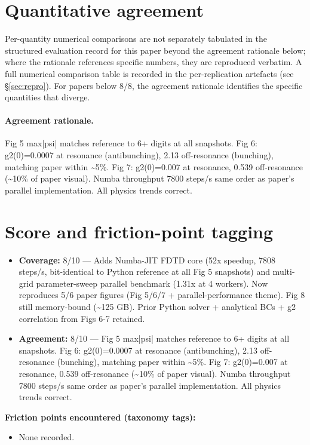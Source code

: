 \documentclass[11pt]{article}
\begin{document}
\section{Quantitative agreement}
Per-quantity numerical comparisons are not separately tabulated in the structured evaluation record for this paper beyond the agreement rationale below; where the rationale references specific numbers, they are reproduced verbatim. A full numerical comparison table is recorded in the per-replication artefacts (see \S\ref{sec:repro}). For papers below 8/8, the agreement rationale identifies the specific quantities that diverge.

\paragraph{Agreement rationale.} Fig 5 max|psi| matches reference to 6+ digits at all snapshots. Fig 6: g2(0)=0.0007 at resonance (antibunching), 2.13 off-resonance (bunching), matching paper within \textasciitilde{}5\%. Fig 7: g2(0)=0.007 at resonance, 0.539 off-resonance (\textasciitilde{}10\% of paper visual). Numba throughput 7800 steps/s same order as paper's parallel implementation. All physics trends correct.

\section{Score and friction-point tagging}\label{sec:friction}
\begin{itemize}
\item \textbf{Coverage:} 8/10 --- Adds Numba-JIT FDTD core (52x speedup, 7808 steps/s, bit-identical to Python reference at all Fig 5 snapshots) and multi-grid parameter-sweep parallel benchmark (1.31x at 4 workers). Now reproduces 5/6 paper figures (Fig 5/6/7 + parallel-performance theme). Fig 8 still memory-bound (\textasciitilde{}125 GB). Prior Python solver + analytical BCs + g2 correlation from Figs 6-7 retained.
\item \textbf{Agreement:} 8/10 --- Fig 5 max|psi| matches reference to 6+ digits at all snapshots. Fig 6: g2(0)=0.0007 at resonance (antibunching), 2.13 off-resonance (bunching), matching paper within \textasciitilde{}5\%. Fig 7: g2(0)=0.007 at resonance, 0.539 off-resonance (\textasciitilde{}10\% of paper visual). Numba throughput 7800 steps/s same order as paper's parallel implementation. All physics trends correct.
\end{itemize}

\noindent\textbf{Friction points encountered (taxonomy tags):}
\begin{itemize}
\item None recorded.
\end{itemize}
\end{document}
